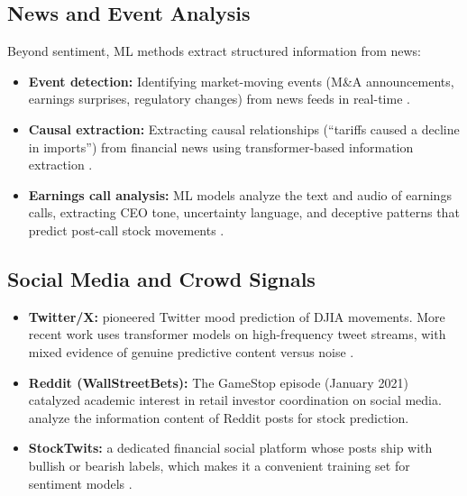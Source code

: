 \subsection{News and Event Analysis}

Beyond sentiment, ML methods extract structured information from news:

\begin{itemize}[leftmargin=*]
    \item \textbf{Event detection:} Identifying market-moving events (M\&A announcements, earnings surprises, regulatory changes) from news feeds in real-time \citep{EinDor2020}.

    \item \textbf{Causal extraction:} Extracting causal relationships (``tariffs caused a decline in imports'') from financial news using transformer-based information extraction \citep{Mariko2022}.

    \item \textbf{Earnings call analysis:} ML models analyze the text and audio of earnings calls, extracting CEO tone, uncertainty language, and deceptive patterns that predict post-call stock movements \citep{Li2021, Qin2019}.
\end{itemize}

\subsection{Social Media and Crowd Signals}

\begin{itemize}[leftmargin=*]
    \item \textbf{Twitter/X:} \citet{Bollen2011} pioneered Twitter mood prediction of DJIA movements. More recent work uses transformer models on high-frequency tweet streams, with mixed evidence of genuine predictive content versus noise \citep{Renault2020}.

    \item \textbf{Reddit (WallStreetBets):} The GameStop episode (January 2021) catalyzed academic interest in retail investor coordination on social media. \citet{Bradley2021} analyze the information content of Reddit posts for stock prediction.

    \item \textbf{StockTwits:} a dedicated financial social platform whose posts ship with bullish or bearish labels, which makes it a convenient training set for sentiment models \citep{Oliveira2017}.
\end{itemize}

